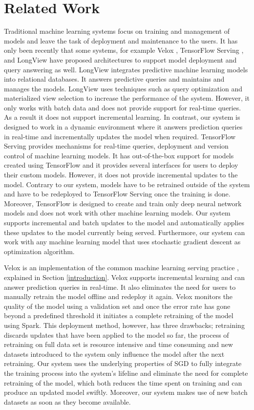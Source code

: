 \documentclass{vldb}
\begin{document}
\section{Related Work} \label{related-work}
Traditional machine learning systems focus on training and management of models and leave the task of deployment and maintenance to the users. 
It has only been recently that some systems, for example Velox \cite{crankshaw2014missing}, TensorFlow Serving \cite{abadi2016tensorflow}, and LongView \cite{akdere2011case} have proposed architectures to support model deployment and query answering as well. 
LongView integrates predictive machine learning models into relational databases. 
It answers predictive queries and maintains and manages the models.
LongView uses techniques such as query optimization and materialized view selection to increase the performance of the system.
However, it only works with batch data and does not provide support for real-time queries. 
As a result it does not support incremental learning.
In contrast, our system is designed to work in a dynamic environment where it answers prediction queries in real-time and incrementally updates the model when required.
TensorFlow Serving provides mechanisms for real-time queries, deployment and version control of machine learning models.
It has out-of-the-box support for models created using TensorFlow and it provides several interfaces for users to deploy their custom models.
However, it does not provide incremental updates to the model.
Contrary to our system, models have to be retrained outside of the system and have to be redeployed to TensorFlow Serving once the training is done.
Moreover, TensorFlow is designed to create and train only deep neural network models and does not work with other machine learning models.
Our system supports incremental and batch updates to the model and automatically applies these updates to the model currently being served.
Furthermore, our system can work with any machine learning model that uses stochastic gradient descent as optimization algorithm.

Velox is an implementation of the common machine learning serving practice \cite{crankshaw2014missing}, explained in Section \ref{introduction}.
Velox supports incremental learning and can answer prediction queries in real-time.
It also eliminates the need for users to manually retrain the model offline and redeploy it again.
Velox monitors the quality of the model using a validation set and once the error rate has gone beyond a predefined threshold it initiates a complete retraining of the model using Spark. 
This deployment method, however, has three drawbacks; retraining discards updates that have been applied to the model so far, the process of retraining on full data set is resource intensive and time consuming and new datasets introduced to the system only influence the model after the next retraining.
Our system uses the underlying properties of SGD to fully integrate the training process into the system's lifeline and eliminate the need for complete retraining of the model, which both reduces the time spent on training and can produce an updated model swiftly.
Moreover, our system makes use of new batch datasets as soon as they become available.  
\end{document}
